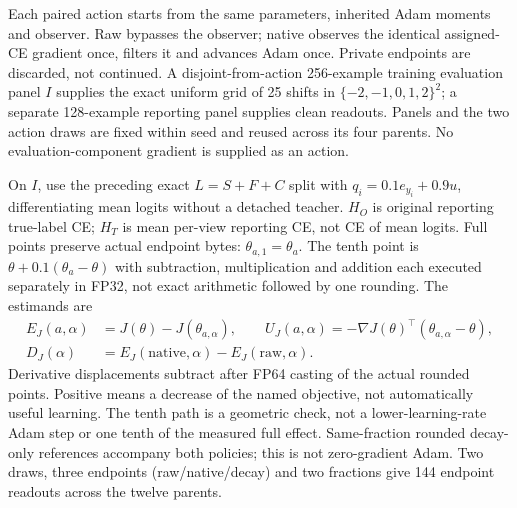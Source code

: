 \documentclass[10pt]{article}
\begin{document}
Each paired action starts from the same parameters, inherited Adam moments and observer. Raw bypasses the observer; native observes the identical assigned-CE gradient once, filters it and advances Adam once. Private endpoints are discarded, not continued. A disjoint-from-action 256-example training evaluation panel $I$ supplies the exact uniform grid of 25 shifts in $\{-2,-1,0,1,2\}^2$; a separate 128-example reporting panel supplies clean readouts. Panels and the two action draws are fixed within seed and reused across its four parents. No evaluation-component gradient is supplied as an action.

On $I$, use the preceding exact $L=S+F+C$ split with $q_i=0.1e_{y_i}+0.9u$, differentiating mean logits without a detached teacher. $H_O$ is original reporting true-label CE; $H_T$ is mean per-view reporting CE, not CE of mean logits. Full points preserve actual endpoint bytes: $\theta_{a,1}=\theta_a$. The tenth point is $\theta+0.1(\theta_a-\theta)$ with subtraction, multiplication and addition each executed separately in FP32, not exact arithmetic followed by one rounding. The estimands are
\begin{align}
E_J(a,\alpha)&=J(\theta)-J(\theta_{a,\alpha}),\qquad
U_J(a,\alpha)=-\nabla J(\theta)^\top(\theta_{a,\alpha}-\theta),\\
D_J(\alpha)&=E_J(\mathrm{native},\alpha)-E_J(\mathrm{raw},\alpha).
\end{align}
Derivative displacements subtract after FP64 casting of the actual rounded points. Positive means a decrease of the named objective, not automatically useful learning. The tenth path is a geometric check, not a lower-learning-rate Adam step or one tenth of the measured full effect. Same-fraction rounded decay-only references accompany both policies; this is not zero-gradient Adam. Two draws, three endpoints (raw/native/decay) and two fractions give 144 endpoint readouts across the twelve parents.
\end{document}
